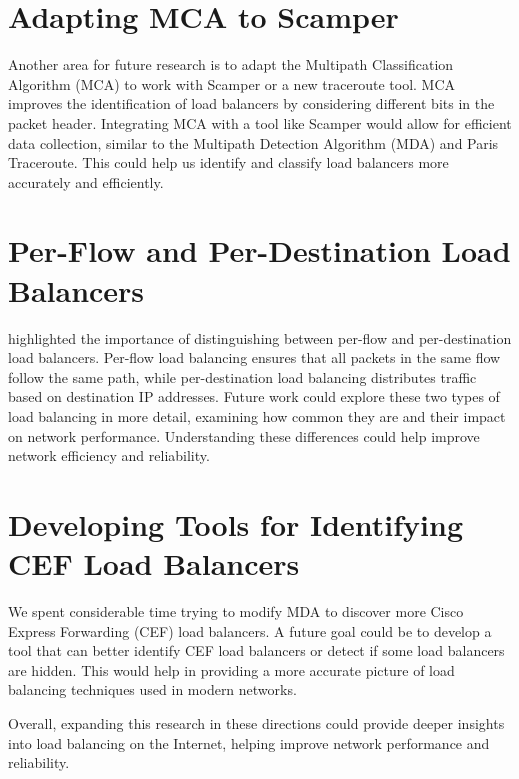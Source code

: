 \documentclass[12pt]{cwru_thesis}
\begin{document}
\section*{Adapting MCA to Scamper}

Another area for future research is to adapt the Multipath Classification Algorithm (MCA) to work with Scamper or a new traceroute tool. MCA improves the identification of load balancers by considering different bits in the packet header. Integrating MCA with a tool like Scamper would allow for efficient data collection, similar to the Multipath Detection Algorithm (MDA) and Paris Traceroute. This could help us identify and classify load balancers more accurately and efficiently.

\section*{Per-Flow and Per-Destination Load Balancers}

\textbf{\cite{4261334}} highlighted the importance of distinguishing between per-flow and per-destination load balancers. Per-flow load balancing ensures that all packets in the same flow follow the same path, while per-destination load balancing distributes traffic based on destination IP addresses. Future work could explore these two types of load balancing in more detail, examining how common they are and their impact on network performance. Understanding these differences could help improve network efficiency and reliability.

\section*{Developing Tools for Identifying CEF Load Balancers}

We spent considerable time trying to modify MDA to discover more Cisco Express Forwarding (CEF) load balancers. A future goal could be to develop a tool that can better identify CEF load balancers or detect if some load balancers are hidden. This would help in providing a more accurate picture of load balancing techniques used in modern networks.

Overall, expanding this research in these directions could provide deeper insights into load balancing on the Internet, helping improve network performance and reliability.



\printbibliography[heading=bibintoc]
\end{document}
